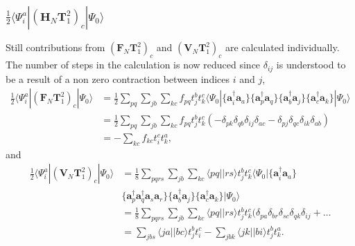 \documentclass[a4paper,norsk,11pt,twoside]{report}
\begin{document}
\subsubsection{$\frac{1}{2} \langle \Psi_i^a | (\textbf{H}_N \textbf{T}_1^2)_c | \Psi_0 \rangle$}
Still contributions from $(\textbf{F}_N \textbf{T}_1^2)_c$ and
$(\textbf{V}_N \textbf{T}_1^2)_c$ are calculated individually. The
number of steps in the calculation is now reduced since $\delta_{ij}$
is understood to be a result of a non zero contraction between indices
$i$ and $j$,
\begin{align}
\frac{1}{2} \langle \Psi_i^a | (\textbf{F}_N \textbf{T}_1^2)_c | \Psi_0 \rangle & = 
\frac{1}{2} \sum_{pq} \sum_{jb} \sum_{kc} f_{pq} t_j^b t_k^c \langle \Psi_0 | \{\textbf{a}_i^{\dag} \textbf{a}_a \} \{\textbf{a}_p^{\dag} \textbf{a}_q \} \{\textbf{a}_b^{\dag} \textbf{a}_j \} \{\textbf{a}_c^{\dag} \textbf{a}_k \} | \Psi_0 \rangle \nonumber \\ &
= \frac{1}{2} \sum_{pq} \sum_{jb} \sum_{kc} f_{pq} t_j^b t_k^c
\left( -\delta_{pk} \delta_{qb} \delta_{ij} \delta_{ac}
- \delta_{pj} \delta_{qc} \delta_{ik} \delta_{ab} \right) \nonumber \\ &
= - \sum_{kc} f_{kc} t_i^c t_k^a,
\end{align}
and
\begin{align}
\frac{1}{2} \langle \Psi_i^a | (\textbf{V}_N \textbf{T}_1^2)_c | \Psi_0 \rangle &
= \frac{1}{8} \sum_{pqrs} \sum_{jb} \sum_{kc} 
\langle pq || rs \rangle t_j^b t_k^c \langle \Psi_0 | 
\{ \textbf{a}^{\dag}_i \textbf{a}_a \} \nonumber \\ &
\{\textbf{a}^{\dag}_p \textbf{a}^{\dag}_q
\textbf{a}_s \textbf{a}_r \} \{\textbf{a}^{\dag}_b \textbf{a}_j \} \{\textbf{a}^{\dag}_c \textbf{a}_k \}
| \Psi_0 \rangle \nonumber \\ &
= \frac{1}{8} \sum_{pqrs} \sum_{jb} \sum_{kc} 
\langle pq || rs \rangle t_j^b t_k^c (
\delta_{pa} \delta_{br} \delta_{sc} \delta_{qk} \delta_{ij} + \dots \nonumber \\ & 
= \sum_{jbs} \langle ja || bc \rangle t_j^b t_i^c
- \sum_{jbk} \langle jk || bi \rangle t_j^b t_k^a .
\end{align}
\end{document}
